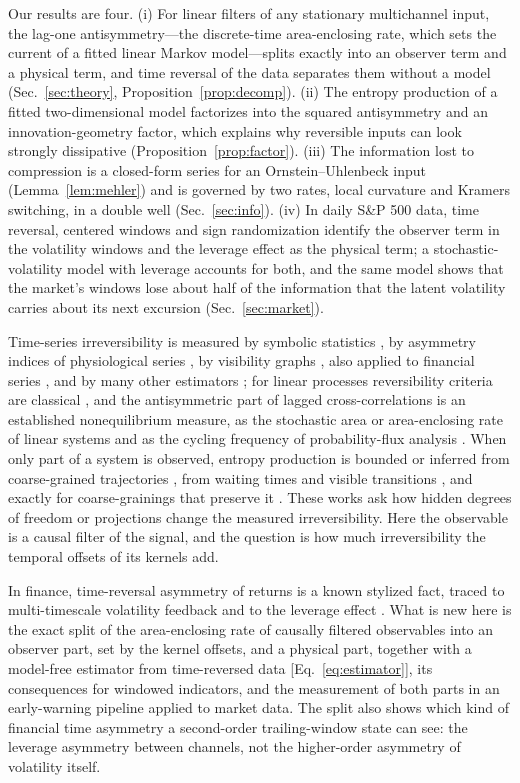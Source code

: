 Our results are four. (i) For linear filters of any stationary multichannel input, the lag-one antisymmetry---the discrete-time area-enclosing rate, which sets the current of a fitted linear Markov model---splits exactly into an observer term and a physical term, and time reversal of the data separates them without a model (Sec.~\ref{sec:theory}, Proposition~\ref{prop:decomp}). (ii) The entropy production of a fitted two-dimensional model factorizes into the squared antisymmetry and an innovation-geometry factor, which explains why reversible inputs can look strongly dissipative (Proposition~\ref{prop:factor}). (iii) The information lost to compression is a closed-form series for an Ornstein--Uhlenbeck input (Lemma~\ref{lem:mehler}) and is governed by two rates, local curvature and Kramers switching, in a double well (Sec.~\ref{sec:info}). (iv) In daily S\&P 500 data, time reversal, centered windows and sign randomization identify the observer term in the volatility windows and the leverage effect as the physical term; a stochastic-volatility model with leverage accounts for both, and the same model shows that the market's windows lose about half of the information that the latent volatility carries about its next excursion (Sec.~\ref{sec:market}).

Time-series irreversibility is measured by symbolic statistics \cite{daw2000}, by asymmetry indices of physiological series \cite{porta2008}, by visibility graphs \cite{lacasa2012}, also applied to financial series \cite{flanagan2016}, and by many other estimators \cite{zanin2021}; for linear processes reversibility criteria are classical \cite{weiss1975,tong2005,chan2006}, and the antisymmetric part of lagged cross-correlations is an established nonequilibrium measure, as the stochastic area or area-enclosing rate of linear systems \cite{ghanta2017,gonzalez2019} and as the cycling frequency of probability-flux analysis \cite{gradziuk2019,battle2016}. When only part of a system is observed, entropy production is bounded or inferred from coarse-grained trajectories \cite{roldan2010,roldan2012}, from waiting times and visible transitions \cite{skinner2021,harunari2022,vandermeer2022}, and exactly for coarse-grainings that preserve it \cite{teza2020}. These works ask how hidden degrees of freedom or projections change the measured irreversibility. Here the observable is a causal filter of the signal, and the question is how much irreversibility the temporal offsets of its kernels add.

In finance, time-reversal asymmetry of returns is a known stylized fact, traced to multi-timescale volatility feedback \cite{zumbach2009,lynch2003,chicheportiche2014} and to the leverage effect \cite{black1976,bouchaud2001}. What is new here is the exact split of the area-enclosing rate of causally filtered observables into an observer part, set by the kernel offsets, and a physical part, together with a model-free estimator from time-reversed data [Eq.~\eqref{eq:estimator}], its consequences for windowed indicators, and the measurement of both parts in an early-warning pipeline applied to market data. The split also shows which kind of financial time asymmetry a second-order trailing-window state can see: the leverage asymmetry between channels, not the higher-order asymmetry of volatility itself.
